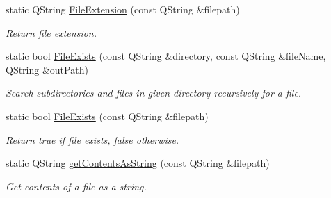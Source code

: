 \begin{DoxyCompactItemize}
\mbox{\label{classrev_1_1_file_reader_aa0d8fa7a54afded5fd0ab90be32c9b20}} 
static Q\+String \mbox{\hyperlink{classrev_1_1_file_reader_aa0d8fa7a54afded5fd0ab90be32c9b20}{File\+Extension}} (const Q\+String \&filepath)
\begin{DoxyCompactList}\small\item\em Return file extension. \end{DoxyCompactList}\item 
\mbox{\label{classrev_1_1_file_reader_a17f6b0ab8ce0734005a2b85f35cf1a7d}} 
static bool \mbox{\hyperlink{classrev_1_1_file_reader_a17f6b0ab8ce0734005a2b85f35cf1a7d}{File\+Exists}} (const Q\+String \&directory, const Q\+String \&file\+Name, Q\+String \&out\+Path)
\begin{DoxyCompactList}\small\item\em Search subdirectories and files in given directory recursively for a file. \end{DoxyCompactList}\item 
\mbox{\label{classrev_1_1_file_reader_abc447e95d05297968dd43eaf02db3a2d}} 
static bool \mbox{\hyperlink{classrev_1_1_file_reader_abc447e95d05297968dd43eaf02db3a2d}{File\+Exists}} (const Q\+String \&filepath)
\begin{DoxyCompactList}\small\item\em Return true if file exists, false otherwise. \end{DoxyCompactList}\item 
\mbox{\label{classrev_1_1_file_reader_a8da6c6710c2dbfae8b2c48198c673173}} 
static Q\+String \mbox{\hyperlink{classrev_1_1_file_reader_a8da6c6710c2dbfae8b2c48198c673173}{get\+Contents\+As\+String}} (const Q\+String \&filepath)
\begin{DoxyCompactList}\small\item\em Get contents of a file as a string. \end{DoxyCompactList}\end{DoxyCompactItemize}
